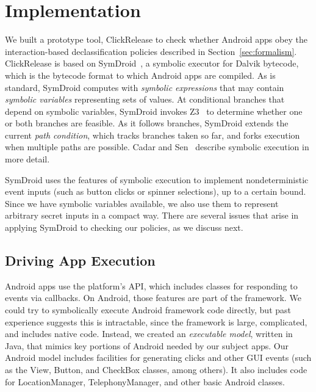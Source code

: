 \documentclass{llncs}
\newcommand{\code}[1]{\textsf{#1}} %
\newcommand{\toolname}{ClickRelease\xspace}
\newcommand{\tr}{t\xspace}
\begin{document}


\section{Implementation}
\label{sec:implementation}

We built a prototype tool, \toolname{} to check whether Android apps obey the
interaction-based declassification policies described in
Section~\ref{sec:formalism}. \toolname{} is based on
SymDroid~\cite{Jeon:2012}, a symbolic executor for Dalvik bytecode,
which is the bytecode format to which Android apps are compiled.
As is standard, SymDroid computes with \emph{symbolic
  expressions} that may contain \emph{symbolic variables}
representing sets of values. At conditional branches that depend on
symbolic variables, SymDroid invokes Z3~\cite{deMoura:2008} to
determine whether one or both branches are feasible. As it follows
branches, SymDroid extends the current \emph{path condition}, which tracks
branches taken so far, and forks execution when multiple paths are
possible. Cadar and Sen~\cite{Cadar:13} describe
symbolic execution in more detail.

SymDroid uses the features of symbolic execution to implement
nondeterministic event inputs (such as button clicks or spinner
selections), up to a certain bound. Since we have symbolic variables
available, we also use them to represent arbitrary secret inputs in a
compact way. There are several issues that arise in applying SymDroid
to checking our policies, as we discuss next.

\subsection{Driving App Execution}
\label{sec:driver}


Android apps use the platform's API, which includes
classes for responding to events via callbacks.
On Android, those features are part of the
framework.  We could try to symbolically execute Android framework code
directly, but past experience suggests this is intractable, since the
framework is large, complicated, and includes native code.
Instead, we created an \emph{executable model}, written in Java, that
mimics key portions of Android needed by our subject apps. Our Android
model includes facilities for generating clicks and
other GUI events (such as the \code{View}, \code{Button}, and
\code{CheckBox} classes, among others). It also includes code for
\code{LocationManager},
\code{TelephonyManager}, and other basic Android classes.
\end{document}
